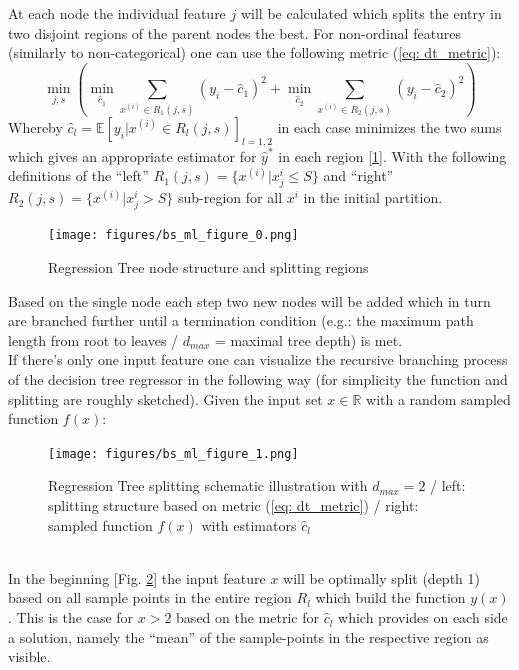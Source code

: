 \documentclass[12pt, a4paper]{article}
\begin{document}
At each node the individual feature $j$ will be calculated which splits the entry in two disjoint regions of the parent nodes the best. For non-ordinal features (similarly to non-categorical) one can use the following metric (\ref{eq: dt_metric}):
\begin{equation}
    \label{eq: dt_metric}
    \underset{ j,s }{\min} \left(
    \underset{ \hat{c}_1 }{\min}
    \sum_{x^{(i)} \in R_1(j,s)} (y_i - \hat{c}_1)^2 +
    \underset{ \hat{c}_2 }{\min}
    \sum_{x^{(i)} \in R_2(j,s)} (y_i - \hat{c}_2)^2
    \right)
\end{equation}
Whereby $\hat{c}_l = \mathbb{E}[y_i | x^{(i)} \in R_l(j,s)]_{l = 1,2}$ in each case minimizes the two sums which gives an appropriate estimator for $\hat{y}^{\ast}$ in each region [\ref{fig: rt_regions}].
With the following definitions of the ``left'' $R_1(j,s) = \{x^{(i)} | x_j^{i} \leq S\}$ and ``right'' $R_2(j,s) = \{x^{(i)} | x_j^{i} > S\}$ sub-region for all $x^{i}$ in the initial partition.
\begin{figure}[!htpb]
    \centering
    \texttt{[image: figures/bs\_ml\_figure\_0.png]}
    \caption[Regression Tree node structure and splitting regions]{Regression Tree node structure and splitting regions}
    \label{fig: rt_regions}
\end{figure}
Based on the single node each step two new nodes will be added which in turn are branched further until a termination condition (e.g.: the maximum path length from root to leaves / $d_{max}$ = maximal tree depth) is met. \\
If there's only one input feature one can visualize the recursive branching process of the decision tree regressor in the following way (for simplicity the function and splitting are roughly sketched). Given the input set $x\in \mathbb{R}$ with a random sampled function $f(x)$:
\begin{figure}[!htpb]
    \centering
    \texttt{[image: figures/bs\_ml\_figure\_1.png]}
    \caption[Regression Tree splitting schematic illustration]{Regression Tree splitting schematic illustration with $d_{max} = 2$ / left: splitting structure based on metric (\ref{eq: dt_metric}) / right: sampled function $f(x)$ with estimators $\hat{c}_l$ }
    \label{fig: rt_splitting_schematic}
\end{figure}
\\
In the beginning [Fig. \ref{fig: rt_splitting_schematic}] the input feature $x$ will be optimally split (depth 1) based on all sample points in the entire region $R_l$ which build the function $y(x)$. This is the case for $x > 2$ based on the metric for $\hat{c}_l$ which provides on each side a solution, namely the ``mean'' of the sample-points in the respective region as visible.
\end{document}
